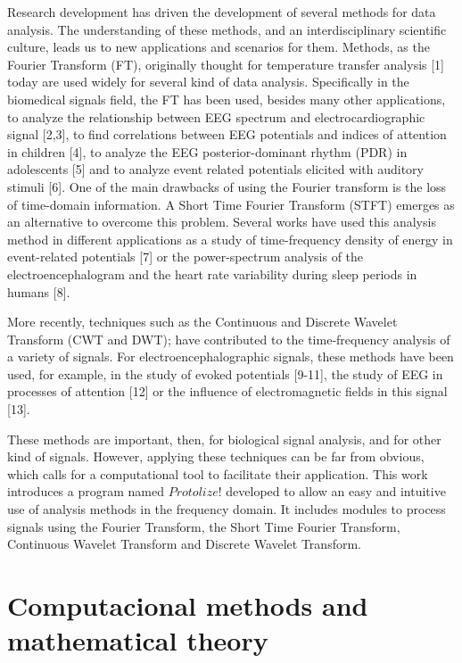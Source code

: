 \documentclass[12pt, a4paper]{article}
\begin{document}
Research development has driven the development of several methods for data analysis. The understanding of these methods, and an interdisciplinary scientific culture, leads us to new applications and scenarios for them. Methods, as the Fourier Transform (FT), originally thought for temperature transfer analysis [1] today are used widely for several kind of data analysis. Specifically in the biomedical signals field, the FT has been used, besides many other applications, to analyze the relationship between EEG spectrum and electrocardiographic signal [2,3], to find correlations between EEG potentials and indices of attention in children [4], to analyze the EEG posterior-dominant rhythm (PDR) in adolescents [5] and to analyze event related potentials elicited with auditory stimuli [6]. One of the main drawbacks of using the Fourier transform is the loss of time-domain information. A Short Time Fourier Transform (STFT) emerges as an alternative to overcome this problem. Several works have used this analysis method in different applications as a study of time-frequency density of energy in event-related potentials [7] or the power-spectrum analysis of the electroencephalogram and the heart rate variability during sleep periods in humans [8]. 

More recently, techniques such as the Continuous and Discrete Wavelet Transform (CWT and DWT); have contributed to the time-frequency analysis of a variety of signals. For electroencephalographic signals, these methods have been used, for example, in the study of evoked potentials [9-11], the study of EEG in processes of attention [12] or the influence of electromagnetic fields in this signal [13].

These methods are important, then, for biological signal analysis, and for other kind of signals. However, applying these techniques can be far from obvious, which calls for a computational tool to facilitate their application. This work introduces a program named $Protolize!$ developed to allow an easy and intuitive use of analysis methods in the frequency domain. It includes modules to process signals using the Fourier Transform, the Short Time Fourier Transform, Continuous Wavelet Transform and Discrete Wavelet Transform. 

\section{Computacional methods and mathematical theory}
\end{document}
